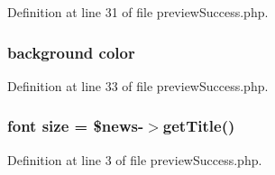 Definition at line 31 of file preview\-Success.\-php.

\hypertarget{preview_success_8php_ac04e2a463631b69c8f70784275a056d6}{
\subsubsection[{color}]{\setlength{\rightskip}{0pt plus 5cm}background color}}\label{preview_success_8php_ac04e2a463631b69c8f70784275a056d6}


Definition at line 33 of file preview\-Success.\-php.

\hypertarget{preview_success_8php_ae20d3ca2acbfbfe24798ca800435f9f1}{
\subsubsection[{size}]{\setlength{\rightskip}{0pt plus 5cm}font size = \$news-\/$>${\bf get\-Title}()}}\label{preview_success_8php_ae20d3ca2acbfbfe24798ca800435f9f1}


Definition at line 3 of file preview\-Success.\-php.

